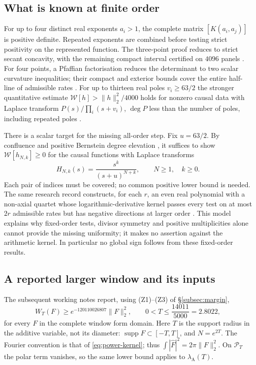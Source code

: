 \documentclass[11pt]{amsart}
\theoremstyle{definition}
\theoremstyle{remark}
\newcommand{\supp}{\operatorname{supp}}
\newcommand{\PT}{\mathcal P_T}
\newcommand{\lamA}{\lambda_{\mathrm A}(T)}
\begin{document}
\subsection{What is known at finite order}\label{subsec:power-orders}
For up to four distinct real exponents $a_i>1$, the complete matrix $[K(a_i,a_j)]$
is positive definite. Repeated exponents are combined before testing strict positivity on the
represented function. The three-point proof reduces to strict secant concavity, with the remaining
compact interval certified on $4096$ panels \cite{PowerThree}. For four points, a Pfaffian
factorisation reduces the determinant to two scalar curvature inequalities; their compact and exterior
bounds cover the entire half-line of admissible rates \cite{PowerFourArbitrary}.
For up to thirteen real poles $v_i\ge63/2$ the stronger quantitative estimate
$\mathcal W[h]>\|h\|_2^2/4000$ holds for nonzero causal data with Laplace transform
$P(s)/\prod_i(s+v_i)$, $\deg P$ less than the number of poles, including repeated poles
\cite{PowerThirteen}.

There is a scalar target for the missing all-order step. Fix $u=63/2$. By confluence and positive
Bernstein degree elevation \cite{PowerAtoms}, it suffices to show $\mathcal W[h_{N,k}]\ge0$ for the
causal functions with Laplace transforms
\[
 H_{N,k}(s)=\frac{s^k}{(s+u)^{N+k}},\qquad N\ge1,\quad k\ge0.
\]
Each pair of indices must be covered; no common positive lower bound is needed.
The same research record constructs, for each $r$, an even real
polynomial with a non-axial quartet whose logarithmic-derivative kernel passes every test on at most
$2r$ admissible rates but has negative directions at larger order \cite{WindowPivot}.
This model explains why fixed-order tests, divisor symmetry and positive multiplicities alone cannot
provide the missing uniformity; it makes no assertion against the arithmetic kernel.
In particular no global sign follows from these fixed-order results.

\subsection{A reported larger window and its inputs}\label{subsec:power-window}
The subsequent working notes \cite{WindowPivot} report, using (Z1)--(Z3) of \S\ref{subsec:margin},
\begin{equation}\label{eq:power-window}
 W_T(F)\ge e^{-120110026807}\|F\|_2^2,
 \qquad 0<T\le\frac{14011}{5000}=2.8022,
\end{equation}
for every $F$ in the complete window form domain. Here $T$ is the support radius in the additive
variable, not its diameter: $\supp F\subset[-T,T]$, and $N=e^{2T}$.
The Fourier convention is that of \eqref{eq:power-kernel}; thus
$\int|\widehat F|^2=2\pi\|F\|_2^2$.
On $\PT$ the polar term vanishes, so the same lower bound applies to $\lamA$.
\end{document}
